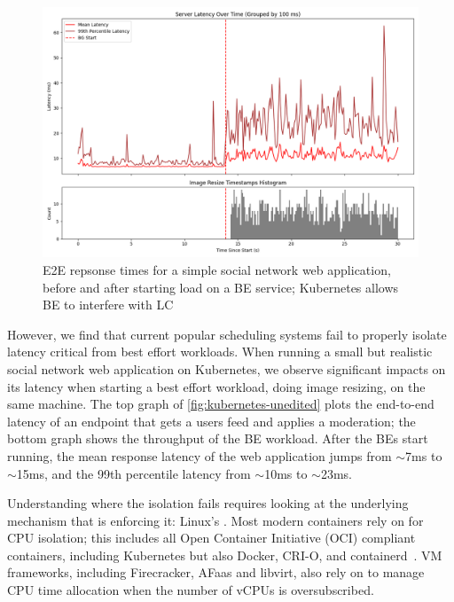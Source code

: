 \begin{figure}[t]
    \centering
    \includegraphics[width=\columnwidth]{graphs/kubernetes-unedited.png}
    \caption{E2E repsonse times for a simple social network web application,
    before and after starting load on a BE service; Kubernetes allows BE to
    interfere with LC}\label{fig:kubernetes-unedited}
\end{figure}

However, we find that current popular scheduling systems fail to properly
isolate latency critical from best effort workloads. When running a small but
realistic social network web application on Kubernetes, we observe significant
impacts on its latency when starting a best effort workload, doing image
resizing, on the same machine. The top graph of
\autoref{fig:kubernetes-unedited} plots the end-to-end latency of an endpoint
that gets a users feed and applies a moderation; the bottom graph shows the
throughput of the BE workload. After the BEs start running, the mean response
latency of the web application jumps from $\sim$7ms to $\sim$15ms, and the 99th
percentile latency from $\sim$10ms to $\sim$23ms. 

Understanding where the isolation fails requires looking at the underlying
mechanism that is enforcing it: Linux's \cgroups{}. Most modern containers rely
on \cgroups{} for CPU isolation; this includes all Open Container Initiative
(OCI) compliant containers, including Kubernetes but also Docker, CRI-O, and
containerd~\cite{oci-cgroups,docker-docs-cgroups,container-isolation-article}.
VM frameworks, including Firecracker, AFaas and libvirt, also rely on \cgroups{}
to manage CPU time allocation when the number of vCPUs is
oversubscribed.~\cite{firecracker-cgroups,afaas,libvirt-cgroups}

